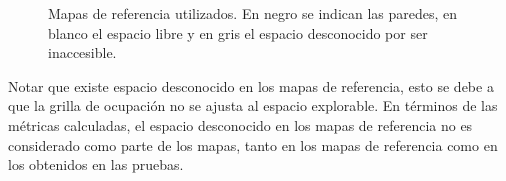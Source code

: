 \begin{figure}[H]
  \centerfloat

  \qquad
  \qquad
  \qquad

  \caption[Mapas de referencia utilizados.]{Mapas de referencia utilizados. En negro se indican las paredes, en blanco el espacio libre y en gris el espacio desconocido por ser inaccesible.}\label{fig:mref}

\end{figure}

Notar que existe espacio desconocido en los mapas de referencia, esto se debe a
que la grilla de ocupación no se ajusta al espacio explorable. En términos de
las métricas calculadas, el espacio desconocido en los mapas de referencia no es
considerado como parte de los mapas, tanto en los mapas de referencia como en
los obtenidos en las pruebas.

